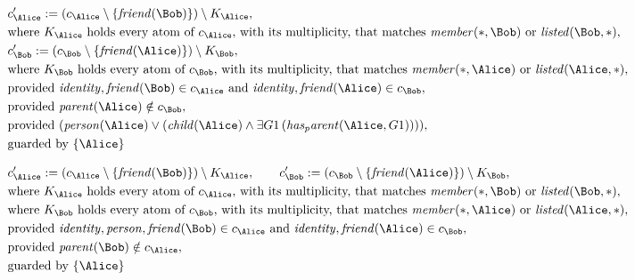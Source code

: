 \begin{align*}
&
c'_
{
\Alice
}
 := 
(c_
{
\Alice
}
 \setminus 
\{
\mathit{
friend
}
(
\Bob
)
\}
) \setminus K_
{
\Alice
}
,\\
&
\text{where } K_
{
\Alice
}
 \text{ holds every atom of } c_
{
\Alice
}
 \text{, with its multiplicity, that matches } 
\mathit{
member
}
(
\ast
,
\Bob
)
 \text{ or } 
\mathit{
listed
}
(
\Bob
,
\ast
)
,\\
&
c'_
{
\Bob
}
 := 
(c_
{
\Bob
}
 \setminus 
\{
\mathit{
friend
}
(
\Alice
)
\}
) \setminus K_
{
\Bob
}
,\\
&
\text{where } K_
{
\Bob
}
 \text{ holds every atom of } c_
{
\Bob
}
 \text{, with its multiplicity, that matches } 
\mathit{
member
}
(
\ast
,
\Alice
)
 \text{ or } 
\mathit{
listed
}
(
\Alice
,
\ast
)
,\\
&
\text{provided } 
\mathit{
identity
}
,
\mathit{
friend
}
(
\Bob
)
 \in c_
{
\Alice
}
 \text{ and } 
\mathit{
identity
}
,
\mathit{
friend
}
(
\Alice
)
 \in c_
{
\Bob
}
,\\
&
\text{provided } 
\mathit{
parent
}
(
\Alice
)
 \notin c_
{
\Bob
}
,\\
&
\text{provided } 
(
\mathit{
person
}
(
\Alice
)
\lor
(
\mathit{
child
}
(
\Alice
)
\land
\exists 
G1
\,(
\mathit{
has_parent
}
(
\Alice
,
G1
)
)
)
)
,\\
&
\text{guarded by } \{
\Alice
\}
\end{align*}

\begin{align*}
&
c'_
{
\Alice
}
 := 
(c_
{
\Alice
}
 \setminus 
\{
\mathit{
friend
}
(
\Bob
)
\}
) \setminus K_
{
\Alice
}
, \qquad 
c'_
{
\Bob
}
 := 
(c_
{
\Bob
}
 \setminus 
\{
\mathit{
friend
}
(
\Alice
)
\}
) \setminus K_
{
\Bob
}
,\\
&
\text{where } K_
{
\Alice
}
 \text{ holds every atom of } c_
{
\Alice
}
 \text{, with its multiplicity, that matches } 
\mathit{
member
}
(
\ast
,
\Bob
)
 \text{ or } 
\mathit{
listed
}
(
\Bob
,
\ast
)
,\\
&
\text{where } K_
{
\Bob
}
 \text{ holds every atom of } c_
{
\Bob
}
 \text{, with its multiplicity, that matches } 
\mathit{
member
}
(
\ast
,
\Alice
)
 \text{ or } 
\mathit{
listed
}
(
\Alice
,
\ast
)
,\\
&
\text{provided } 
\mathit{
identity
}
,
\mathit{
person
}
,
\mathit{
friend
}
(
\Bob
)
 \in c_
{
\Alice
}
 \text{ and } 
\mathit{
identity
}
,
\mathit{
friend
}
(
\Alice
)
 \in c_
{
\Bob
}
,\\
&
\text{provided } 
\mathit{
parent
}
(
\Bob
)
 \notin c_
{
\Alice
}
,\\
&
\text{guarded by } \{
\Alice
\}
\end{align*}
